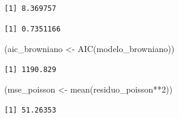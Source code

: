 \documentclass[
  letterpaper,
  DIV=11,
  numbers=noendperiod]{scrreprt}
\newenvironment{Shaded}{\begin{snugshade}}{\end{snugshade}}
\newcommand{\AttributeTok}[1]{\textcolor[rgb]{0.40,0.45,0.13}{#1}}
\newcommand{\DecValTok}[1]{\textcolor[rgb]{0.68,0.00,0.00}{#1}}
\newcommand{\FunctionTok}[1]{\textcolor[rgb]{0.28,0.35,0.67}{#1}}
\newcommand{\NormalTok}[1]{\textcolor[rgb]{0.00,0.23,0.31}{#1}}
\newcommand{\OtherTok}[1]{\textcolor[rgb]{0.00,0.23,0.31}{#1}}
\newcommand{\SpecialCharTok}[1]{\textcolor[rgb]{0.37,0.37,0.37}{#1}}
\begin{document}
\begin{verbatim}
[1] 8.369757
\end{verbatim}

\begin{Shaded}
\end{Shaded}

\begin{verbatim}
[1] 0.7351166
\end{verbatim}

\begin{Shaded}
\begin{Highlighting}[]
\NormalTok{(aic\_browniano }\OtherTok{\textless{}{-}} \FunctionTok{AIC}\NormalTok{(modelo\_browniano))}
\end{Highlighting}
\end{Shaded}

\begin{verbatim}
[1] 1190.829
\end{verbatim}

\begin{Shaded}
\begin{Highlighting}[]
\NormalTok{(mse\_poisson }\OtherTok{\textless{}{-}} \FunctionTok{mean}\NormalTok{(residuo\_poisson}\SpecialCharTok{**}\DecValTok{2}\NormalTok{))}
\end{Highlighting}
\end{Shaded}

\begin{verbatim}
[1] 51.26353
\end{verbatim}

\begin{Shaded}
\end{Shaded}
\end{document}
